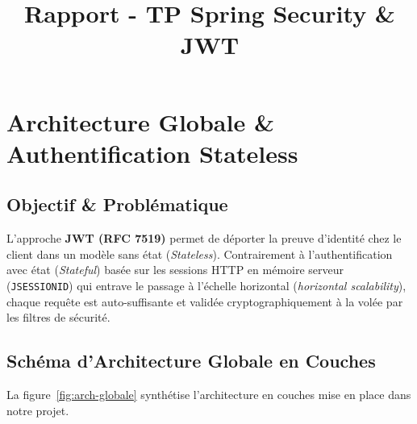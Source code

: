 \documentclass{rapportFSR}
\title{Rapport - TP Spring Security \& JWT}
\begin{document}
\sujet{} 

\fairemarges
\fairepagedegarde
\tabledematieres
\newpage
\listoffigures
\newpage

\section{Architecture Globale \& Authentification Stateless}

\subsection{Objectif \& Problématique}
L'approche \textbf{JWT (RFC 7519)} permet de déporter la preuve d'identité chez le client dans un modèle sans état (\textit{Stateless}). Contrairement à l'authentification avec état (\textit{Stateful}) basée sur les sessions HTTP en mémoire serveur (\texttt{JSESSIONID}) qui entrave le passage à l'échelle horizontal (\textit{horizontal scalability}), chaque requête est auto-suffisante et validée cryptographiquement à la volée par les filtres de sécurité.

\subsection{Schéma d'Architecture Globale en Couches}
La figure~\ref{fig:arch-globale} synthétise l'architecture en couches mise en place dans notre projet.
\end{document}
